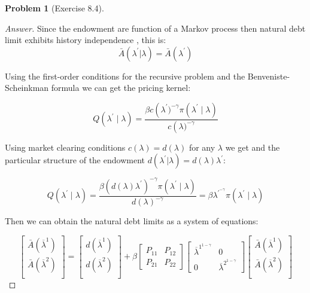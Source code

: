 \documentclass[12pt]{article}
\theoremstyle{definition}
\newtheorem{problem}{Problem}
\begin{document}
\begin{problem}[Exercise 8.4]
\begin{proof}[Answer]
Since the endowment are function of a Markov process then natural debt limit exhibits history independence \cite[p.~278]{ljungqvist2018recursive}, this is:
$$\bar{A}(\lambda^\prime|\lambda) = \bar{A}(\lambda^\prime)$$

Using the first-order conditions for the recursive problem and the Benveniste-
Scheinkman formula we can get the pricing kernel:

$$
 Q\left(\lambda^{\prime} \mid \lambda\right) = \frac{\beta  c\left(\lambda^{\prime})^{-\gamma} \pi\left(\lambda^{\prime} \mid \lambda\right)  }{c\left(\lambda)^{-\gamma}}
$$

Using market clearing conditions $c(\lambda) = d(\lambda)$ for any $\lambda$ we get and the particular structure of the endowment $d(\lambda^\prime|\lambda) = d(\lambda)\lambda^\prime$:

$$
 Q\left(\lambda^{\prime} \mid \lambda\right) = \frac{\beta  (d(\lambda)\lambda^\prime)^{-\gamma} \pi\left(\lambda^{\prime} \mid \lambda\right)  }{d(\lambda)^{-\gamma}} = \beta  \lambda^\prime^{-\gamma} \pi\left(\lambda^{\prime} \mid \lambda\right)
$$

Then we can obtain the natural debt limits as a system of equations:

$$\left[\begin{array}{c}
    \bar{A}(\overline{\lambda}^1)\\
    \bar{A}(\overline{\lambda}^2)\\
\end{array}\right] =\left[\begin{array}{cc}
    d(\overline{\lambda}^1)\\
    d(\overline{\lambda}^2)\\
\end{array}\right] +\beta  \left[\begin{array}{cc}
    P_{11} & P_{12}  \\
    P_{21} & P_{22}  
\end{array}\right]
  \left[\begin{array}{cc}
    \overline{\lambda}^1^{1-\gamma} & 0  \\
    0 & \overline{\lambda}^2^{1-\gamma}
\end{array}\right]
\left[\begin{array}{c}
    \bar{A}(\overline{\lambda}^1)\\
    \bar{A}(\overline{\lambda}^2)\\
\end{array}\right]$$


\end{proof}
\end{problem}
\end{document}
